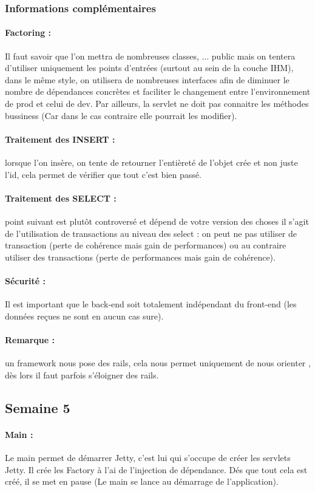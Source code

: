\documentclass{article}[12pt]
\begin{document}
\subsubsection{Informations complémentaires} 
\paragraph{Factoring : } Il faut savoir que l'on mettra de nombreuses classes, ... public mais on tentera d'utiliser uniquement les points d'entrées (surtout au sein de la couche IHM), dans le même style, on utilisera de nombreuses interfaces afin de diminuer le nombre de dépendances concrètes et faciliter le changement entre l'environnement de prod et celui de dev. Par ailleurs, la servlet ne doit pas connaitre les méthodes bussiness (Car dans le cas contraire elle pourrait les modifier). 
\paragraph{Traitement des INSERT : }lorsque l'on insère, on tente de retourner l'entièreté de l'objet crée et non juste l'id, cela permet de vérifier que tout c'est bien passé. 
\paragraph{Traitement des SELECT : } point suivant est plutôt controversé et dépend de votre version des choses il s'agit de l'utilisation de transactions au niveau des select : on peut ne pas utiliser de transaction (perte de cohérence mais gain de performances) ou au contraire utiliser des transactions (perte de performances mais gain de cohérence). 
\paragraph{Sécurité : } Il est important que le back-end soit totalement indépendant du front-end (les données reçues ne sont en aucun cas sure).
\paragraph{Remarque : } un framework nous pose des rails, cela nous permet uniquement de nous orienter , dès lors il faut parfois s'éloigner des rails.
\subsection{Semaine 5}
\paragraph{Main : } Le main permet de démarrer Jetty, c'est lui qui s'occupe de créer les servlets Jetty. Il crée les Factory à l'ai de l'injection de dépendance. Dés que tout cela est créé, il se met en pause (Le main se lance au démarrage de l'application).
\end{document}
